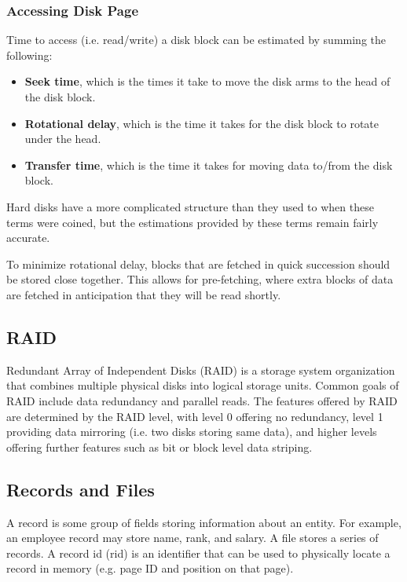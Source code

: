 \documentclass[12pt,titlepage]{article}
\begin{document}
      \subsubsection{Accessing Disk Page}
        Time to access (i.e. read/write) a disk block can be estimated by summing the following:
        \begin{itemize}
          \item \textbf{Seek time}, which is the times it take to move the disk arms to the head of the disk block.
          \item \textbf{Rotational delay}, which is the time it takes for the disk block to rotate under the head.
          \item \textbf{Transfer time}, which is the time it takes for moving data to/from the disk block.
        \end{itemize}

        Hard disks have a more complicated structure than they used to when these terms were coined, but the
        estimations provided by these terms remain fairly accurate.

        To minimize rotational delay, blocks that are fetched in quick succession should be stored close together.
        This allows for pre-fetching, where extra blocks of data are fetched in anticipation that they will be
        read shortly.

    \subsection{RAID}
      Redundant Array of Independent Disks (RAID) is a storage system organization that combines multiple physical
      disks into logical storage units. Common goals of RAID include data redundancy and parallel reads. The features
      offered by RAID are determined by the RAID level, with level 0 offering no redundancy, level 1 providing
      data mirroring (i.e. two disks storing same data), and higher levels offering further features such as bit
      or block level data striping.

    \subsection{Records and Files}
      A record is some group of fields storing information about an entity. For example, an employee record may
      store name, rank, and salary. A file stores a series of records. A record id (rid) is an identifier that can
      be used to physically locate a record in memory (e.g. page ID and position on that page).
\end{document}
